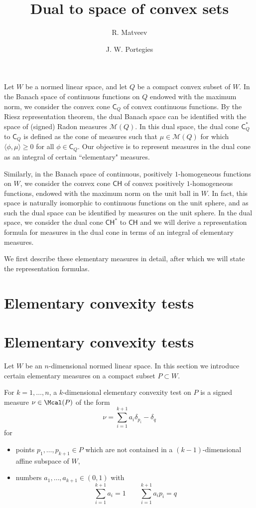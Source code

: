 \documentclass[12pt]{amsart}
\title[Tropical Limits]{Dual to space of convex sets}
\author[RM]{R. Matveev}
\author[JWP]{J. W. Portegies}
\let\Section=\section
\renewcommand{\section}[2][empty]{%
  \xdef\SubsectionName{}%
  \ifthenelse{\equal{#1}{empty}}%
               {\xdef\SectionName{#2}%
                \Section{#2}}%
               {\xdef\SectionName{#1}%
                \Section[#1]{#2}}%
}
\begin{document}
\thispagestyle{fancy} 
\maketitle

Let $W$ be a normed linear space, and let $Q$ be a compact convex subset of $W$. 
In the Banach space of continuous functions on $Q$ endowed with the maximum norm, we consider the convex cone $\mathsf{C}_Q$ of convex continuous functions. By the Riesz representation theorem, the dual Banach space can be identified with the space of (signed) Radon measures $\mathcal{M}(Q)$. In this dual space, the dual cone $\mathsf{C}_Q^*$ to $\mathsf{C}_Q$ is defined as the cone of measures such that $\mu \in \mathcal{M}(Q)$ for which $\langle \phi, \mu \rangle \geq 0$ for all $\phi \in \mathsf{C}_Q$. Our objective is to represent measures in the dual cone as an integral of certain ``elementary" measures. 

Similarly, in the Banach space of continuous, positively $1$-homogeneous functions on $W$, we consider the convex cone $\mathsf{CH}$ of convex positively $1$-homogeneous functions, endowed with the maximum norm on the unit ball in $W$. In fact, this space is naturally isomorphic to continuous functions on the unit sphere, and as such the dual space can be identified by measures on the unit sphere. In the dual space, we consider the dual cone  $\mathsf{CH}^*$ to $\mathsf{CH}$ and we will derive a representation formula for measures in the dual cone in terms of an integral of elementary measures.

We first describe these elementary measures in detail, after which we will state the representation formulas.

\section{Elementary convexity tests}

Let $W$ be an $n$-dimensional normed linear space. 
In this section we introduce certain elementary measures on a compact subset $P\subset W$. 

For $k = 1, \dots, n$, a $k$-dimensional elementary convexity test on $P$ is a signed measure $\nu \in \Mcal(P)$ of the form 
\[
\nu = \sum_{i=1}^{k+1} a_i \delta_{p_i} - \delta_q
\]
for 
\begin{itemize}
	\item points $p_1, \dots, p_{k+1} \in P$ which are not contained in a $(k-1)$-dimensional affine subspace of $W$,
	\item numbers $a_1, \dots, a_{k+1} \in (0,1)$ with 
	\[
	\sum_{i=1}^{k+1} a_i = 1 \qquad \sum_{i=1}^{k+1} a_i p_i = q
	\] 
\end{itemize}
\end{document}
